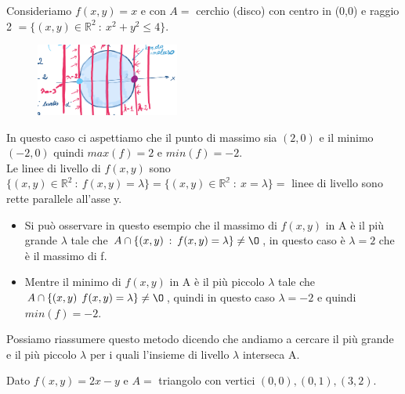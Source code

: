 \begin{example}
Consideriamo $f(x,y) = x$ e con $A = $ cerchio (disco) con centro in (0,0) e raggio 2 $= \{(x,y) \in \mathbb{R}^2 \::\: x^2 + y^2 \leq 4\}$. 
\end{example}
\begin{figure}
    \vspace{-20pt}
    \centering
    \includegraphics[width=4.7cm]{images/max-min-ess-insiemi-livello-1.png}
\end{figure}
In questo caso ci aspettiamo che il punto di massimo sia $(2,0)$ e il minimo $(-2, 0)$ quindi $max(f) = 2$ e $min(f) = -2$.\\
Le linee di livello di $f(x,y)$ sono $\{(x,y) \in \mathbb{R}^2 \::\: f(x,y) = \lambda\} = \{(x,y) \in \mathbb{R^2} \::\: x = \lambda\} =$ linee di livello sono rette parallele all'asse y.
\begin{itemize}
    \item Si può osservare in questo esempio che il massimo di $f(x,y)$ in A è il più grande $\lambda$ tale che $A \cap \{(x,y) \::\: f(x,y) = \lambda\} \neq \O$, in questo caso è $\lambda = 2$ che è il massimo di f.
    \item Mentre il minimo di $f(x,y)$ in A è il più piccolo $\lambda$ tale che $A \cap \{(x,y) \:\: f(x,y) = \lambda\}\neq \O$, quindi in questo caso $\lambda = -2$ e quindi $min(f) = -2$.
\end{itemize}
\hspace{-15pt}Possiamo riassumere questo metodo dicendo che andiamo a cercare il più grande e il più piccolo $\lambda$ per i quali l'insieme di livello $\lambda$ interseca A.

\begin{example}
Dato $f(x,y) = 2x-y$ e $A =$ triangolo con vertici $(0,0), (0,1), (3,2)$. 
\end{example}

